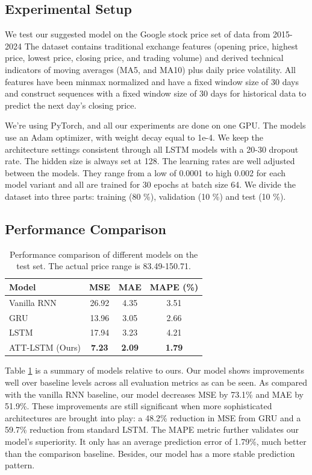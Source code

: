 \documentclass[10pt,twocolumn,letterpaper]{article}
\begin{document}
\subsection{Experimental Setup}
We test our suggested model on the Google stock price set of data from 2015-2024 The dataset contains traditional exchange features (opening price, highest price, lowest price, closing price, and trading volume) and derived technical indicators of moving averages (MA5, and MA10) plus daily price volatility. All features have been minmax normalized and have a fixed window size of 30 days and construct sequences with a fixed window size of 30 days for historical data to predict the next day's closing price.

We're using PyTorch, and all our experiments are done on one GPU. The models use an Adam optimizer, with weight decay equal to 1e-4. We keep the architecture settings consistent through all LSTM models with a 20-30 dropout rate. The hidden size is always set at 128. The learning rates are well adjusted between the models. They range from a low of 0.0001 to high 0.002 for each model variant and all are trained for 30 epochs at batch size 64. We divide the dataset into three parts: training (80 \%), validation (10 \%) and test (10 \%). 
\subsection{Performance Comparison}
\begin{table}[H] %
	\setlength{\tabcolsep}{4pt} 
	\renewcommand{\arraystretch}{1.2}
	\centering
	\begin{tabular}{l|c|c|c}
		\hline
		Model & MSE & MAE  & MAPE (\%) \\
		\hline
		Vanilla RNN & 26.92 & 4.35 &  3.51 \\
		GRU & 13.96 & 3.05 &  2.66 \\
		LSTM & 17.94 & 3.23 &  4.21 \\
		ATT-LSTM (Ours) & \textbf{7.23} & \textbf{2.09} & \textbf{1.79} \\
		\hline
	\end{tabular}
	\caption{Performance comparison of different models on the test set. The actual price range is 83.49-150.71.}
	\label{table:performance}
\end{table}

Table \ref{table:performance} is a summary of models relative to ours. Our model shows improvements well over baseline levels across all evaluation metrics as can be seen. As compared with the vanilla RNN baseline, our model decreases MSE by 73.1\% and MAE by 51.9\%. These improvements are still significant when more sophisticated architectures are brought into play: a 48.2\% reduction in MSE from GRU and a 59.7\% reduction from standard LSTM. The MAPE metric further validates our model's superiority. It only has an average prediction error of 1.79\%, much better than the comparison baseline. Besides, our model has a more stable prediction pattern. 
\end{document}
